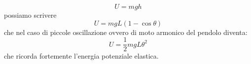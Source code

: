 \documentclass[a4paper,10pt,oneside]{article}
\begin{document}
\begin{equation}
 U=mgh
\end{equation}
possiamo scrivere
\begin{equation}
 U=mgL(1-\cos\theta)
\end{equation}
che nel caso di piccole oscillazione ovvero di moto armonico del pendolo diventa:
\begin{equation}
 U=\frac{1}{2}mgL\theta^2
\end{equation}
che ricorda fortemente l'energia potenziale elastica.
\end{document}
